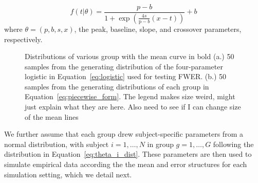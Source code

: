 \documentclass{article}
\begin{document}
\begin{equation}\label{eq:logistic}
f(t | \theta) = \frac{p-b}{1 + \exp \left(\frac{4s}{\text{p}-b} (x - t) \right)} + b
\end{equation}
where $\theta = (p, b, s, x)$, the peak, baseline, slope, and crossover parameters, respectively.


\begin{figure}
    \centering
    \caption{Distributions of various group with the mean curve in bold (a.) 50 samples from the generating distribution of the four-parameter logistic in Equation~\ref{eq:logistic} used for testing FWER. (b.) 50 samples from the generating distributions of each group in Equation~\ref{eq:piecewise_form}. The legend makes size weird, might just explain what they are here. Also need to see if I can change size of the mean lines}
\label{fig:distribution}
\end{figure}



We further assume that each group drew subject-specific parameters from a normal distribution, with subject $i = 1, \dots, N$ in group $g = 1, \dots, G$ following the distribution in Equation~\ref{eq:theta_i_dist}. These parameters are then used to simulate empirical data according the the mean and error structures for each simulation setting, which we detail next. 
\end{document}
